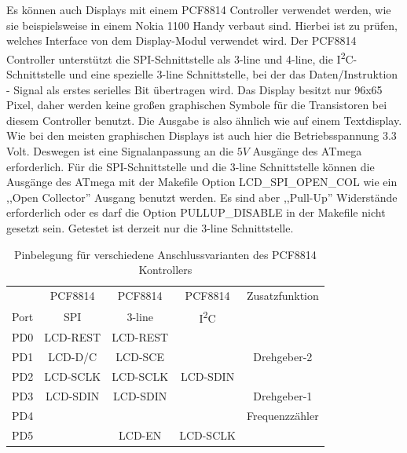 Es können auch Displays mit einem PCF8814 Controller verwendet werden, wie sie beispielsweise
in einem Nokia 1100 Handy verbaut sind. Hierbei ist zu prüfen, welches Interface von dem Display-Modul
verwendet wird. Der PCF8814 Controller unterstützt die SPI-Schnittstelle als 3-line und 4-line,
die I\textsuperscript{2}C-Schnittstelle und eine spezielle 3-line Schnittstelle, bei der das
Daten/Instruktion - Signal als erstes serielles Bit übertragen wird.
Das Display besitzt nur 96x65 Pixel, daher werden keine großen graphischen Symbole für die
Transistoren bei diesem Controller benutzt. Die Ausgabe is also ähnlich wie auf einem Textdisplay.
Wie bei den meisten graphischen Displays ist auch hier die Betriebsspannung 3.3 Volt.
Deswegen ist eine Signalanpassung an die \(5V\) Ausgänge des ATmega erforderlich.
Für die SPI-Schnittstelle und die 3-line Schnittstelle können die Ausgänge des ATmega
mit der Makefile Option LCD\_SPI\_OPEN\_COL wie ein ,,Open Collector'' Ausgang benutzt werden.
Es sind aber ,,Pull-Up'' Widerstände erforderlich oder es darf die Option PULLUP\_DISABLE
in der Makefile nicht gesetzt sein.
Getestet ist derzeit nur die 3-line Schnittstelle.

\begin{table}[H]
  \begin{center}
    \begin{tabular}{| c || c | c | c | c |}
    \hline
           &  PCF8814    & PCF8814        & PCF8814     & Zusatzfunktion \\
      Port &    SPI      & 3-line         &   I\textsuperscript{2}C      & \\
    \hline
    \hline
    PD0    &   LCD-REST  & LCD-REST       &            & \\
    \hline
    PD1    &   LCD-D/C   & LCD-SCE        &             & Drehgeber-2 \\
    \hline
    PD2    &   LCD-SCLK  & LCD-SCLK       &  LCD-SDIN   & \\
    \hline
    PD3    &   LCD-SDIN  & LCD-SDIN       &             & Drehgeber-1 \\
    \hline
    PD4    &             &                &             & Frequenzzähler \\
    \hline
    PD5    &             & LCD-EN         &   LCD-SCLK  & \\
    \hline
    \end{tabular}
  \end{center}
  \caption{Pinbelegung für verschiedene Anschlussvarianten des PCF8814 Kontrollers}
  \label{tab:PCF8814-con}
\end{table}

